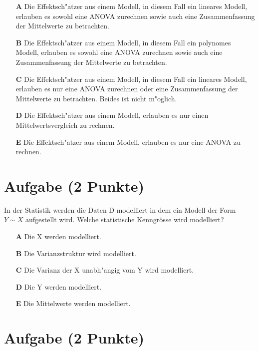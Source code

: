 \documentclass[a4paper, 10pt]{scrartcl}\usepackage[]{graphicx}\usepackage[]{color}
\begin{document}
\begin{enumerate}
\item [\textbf{A} \msquare] Die Effektsch{"a}tzer aus einem Modell, in diesem Fall ein lineares Modell, erlauben es sowohl eine ANOVA zurechnen sowie auch eine Zusammenfassung der Mittelwerte zu betrachten.
\item [\textbf{B} \msquare] Die Effektsch{"a}tzer aus einem Modell, in diesem Fall ein polynomes Modell, erlauben es sowohl eine ANOVA zurechnen sowie auch eine Zusammenfassung der Mittelwerte zu betrachten.
\item [\textbf{C} \msquare] Die Effektsch{"a}tzer aus einem Modell, in diesem Fall ein lineares Modell, erlauben es nur eine ANOVA zurechnen oder eine Zusammenfassung der Mittelwerte zu betrachten. Beides ist nicht m{"o}glich.
\item [\textbf{D} \msquare] Die Effektsch{"a}tzer aus einem Modell, erlauben es nur einen Mittelwertsvergleich zu rechnen.
\item [\textbf{E} \msquare] Die Effektsch{"a}tzer aus einem Modell, erlauben es nur eine ANOVA zu rechnen. 
\end{enumerate}

\section{Aufgabe \hfill (2 Punkte)}

In der Statistik werden die Daten D modelliert in dem ein Modell der Form
$Y \sim X$ aufgestellt wird. Welche statistische Kenngr{\"o}sse wird modelliert? 



\begin{enumerate}
\item [\textbf{A} \msquare] Die X werden modelliert.
\item [\textbf{B} \msquare] Die Varianzstruktur wird modelliert.
\item [\textbf{C} \msquare] Die Varianz der X unabh{"a}ngig vom Y wird modelliert.
\item [\textbf{D} \msquare] Die Y werden modelliert.
\item [\textbf{E} \msquare] Die Mittelwerte werden modelliert.
\end{enumerate}

\section{Aufgabe \hfill (2 Punkte)}
\end{document}

